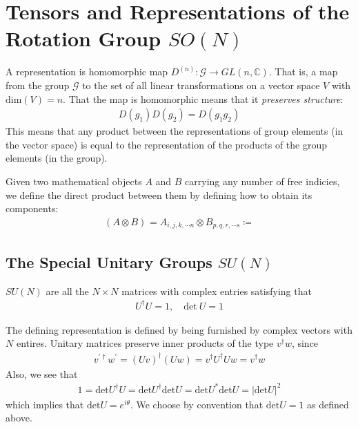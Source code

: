 \section{Tensors and Representations of the Rotation Group \(SO(N)\)}
\begin{definition}
    A representation is homomorphic map \(D^{(n)} : \mathcal{G} \to GL (n, \mathbb{C})\). That is, a map from the group \(\mathcal{G}\) to the set of all linear transformations on a vector space \(V\) with \(\mathrm{dim} (V) = n\). That the map is homomorphic means that it \textit{preserves structure}: \begin{align*}
        D(g_1) D(g_2) = D(g_1 g_2)
    \end{align*}
    This means that any product between the representations of group elements (in the vector space) is equal to the representation of the products of the group elements (in the group).
\end{definition}

\begin{definition}
    Given two mathematical objects \(A\) and \(B\) carrying any number of free indicies, we define the direct product between them by defining how to obtain its components:
    \begin{align*}
        (A \otimes B)_{} = A_{i, j, k, \cdots n} \otimes B_{p, q, r, \cdots s} \coloneqq 
    \end{align*}
\end{definition}

\subsection{The Special Unitary Groups \(SU(N)\)}
\begin{definition}[\(SU(N)\)]
    \(SU(N)\) are all the \(N \times N\) matrices with complex entries satisfying that \begin{align*}
        U ^{\dagger} U = 1, \quad \mathrm{det}\ U = 1
    \end{align*}
\end{definition}
The defining representation is defined by being furnished by complex vectors with \(N\) entires. Unitary matrices preserve inner products of the type \(v ^{\dagger} w\), since 
\begin{align*}
    v^{\prime \dagger} w^{\prime} = \left( U v \right) ^{\dagger} \left( U w \right) = v ^{\dagger} U ^{\dagger} U w = v^{\dagger} w
\end{align*} 
Also, we see that \begin{align*}
    1 = \mathrm{det} U ^{\dagger} U = \mathrm{det} U ^{\dagger} \mathrm{det} U = \mathrm{det} U ^{\ast} \mathrm{det} U = \left| \mathrm{det} U \right| ^{2} 
\end{align*}
which implies that \(\mathrm{det} U = e^{i \theta }\). We choose by convention that \(\mathrm{det}  U = 1\) as defined above. 

